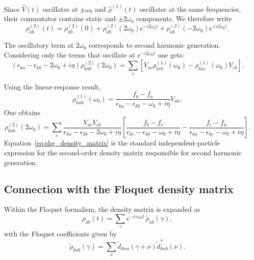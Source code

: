 \documentclass[aps,physrev,preprint,groupedaddress]{revtex4-2}
\renewcommand{\[}{\left[}
\renewcommand{\]}{\right]}
\renewcommand{\(}{\left(}
\renewcommand{\)}{\right)}
\begin{document}
Since $\hat V(t)$ oscillates at $\pm\omega_0$ and
$\hat\rho^{(1)}(t)$ oscillates at the same frequencies,
their commutator contains static and $\pm2\omega_0$
components. We therefore write
\begin{equation}
\rho^{(2)}_{ab}(t)
=
\rho^{(2)}_{ab}(0)
+
\rho^{(2)}_{ab}(2\omega_0)e^{-i2\omega_0 t}
+
\rho^{(2)}_{ab}(-2\omega_0)e^{+i2\omega_0 t}.
\end{equation}

The oscillatory term at $2\omega_0$ corresponds to
second harmonic generation.
Considering only the terms that oscillate at $e^{-i2\omega_0 t}$ one gets:
\begin{equation}
\left(
\epsilon_{ka}-\epsilon_{kb}-2\omega_0+i\eta
\right)
\rho^{(2)}_{kab}(2\omega_0)
=
\sum_c
\left[
V_{ac}\rho^{(1)}_{kcb}(\omega_0)
-
\rho^{(1)}_{kac}(\omega_0)V_{cb}
\right].
\label{eq:second_order_dm_freq}
\end{equation}

Using the linear-response result,
\begin{equation}
\rho^{(1)}_{kab}(\omega_0)
=
\frac{f_b-f_a}
{\epsilon_{ka}-\epsilon_{kb}-\omega_0+i\eta}
V_{ab},
\end{equation}
One obtains
\begin{equation}
\boxed{
\rho^{(2)}_{kab}(2\omega_0)
=
\sum_c
\frac{
V_{ac} V_{cb}
}{
\epsilon_{ka}-\epsilon_{kb}-2\omega_0+i\eta
}
\left[
\frac{f_b-f_c}
{\epsilon_{kc}-\epsilon_{kb}-\omega_0+i\eta}
-
\frac{f_c-f_a}
{\epsilon_{ka}-\epsilon_{kc}-\omega_0+i\eta}
\right]
}.
\label{eq:shg_density_matrix}
\end{equation}
Equation~\eqref{eq:shg_density_matrix} is the standard
independent-particle expression for the second-order density
matrix responsible for second harmonic generation.

\subsection{Connection with the Floquet density matrix}

Within the Floquet formalism, the density matrix is expanded as
\begin{equation}
\rho_{ab}(t)
=
\sum_{\gamma} e^{-i\gamma\omega_0 t}\,
\tilde\rho_{ab}(\gamma),
\end{equation}
with the Floquet coefficients given by
\begin{equation}
\tilde\rho_{kab}(\gamma)
=
\sum_{\nu}
\tilde d_{kna}(\gamma+\nu)
\tilde d^{*}_{knb}(\nu).
\end{equation}
\end{document}
